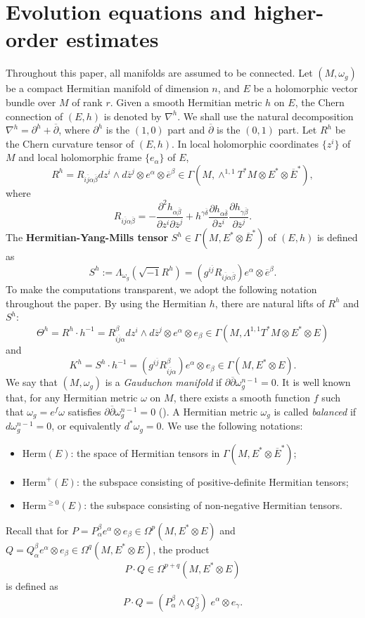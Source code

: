 \documentclass[12pt, reqno]{amsart}
\newcommand\bp{{\bar\partial}}
\theoremstyle{plain}
\theoremstyle{definition}
\newcommand{\p}{\partial}
\renewcommand{\bar}{\overline}
\newcommand{\beq}{\begin{equation}}
\newcommand{\eeq}{\end{equation}}
\renewcommand{\bp}{\bar{\partial}}
\newcommand{\ts}{\otimes}
\renewcommand{\>}{\rightarrow}
\renewcommand{\>}{\rightarrow}
\renewcommand{\p}{{\partial}}
\renewcommand{\bp}{{\bar{\partial}}}
\newcommand{\om}{\omega}
\renewcommand{\bar}{\overline}
\newcommand{\smo}{\sqrt{-1}}
\newcommand{\Herm}{\mathrm{Herm}}
\numberwithin{equation}{section} %
\begin{document}
\section{Evolution equations and higher-order estimates}
Throughout this paper, all manifolds are assumed to be connected.
Let $(M,\omega_g) $ be a compact Hermitian manifold of dimension
$n$, and $E$ be a holomorphic vector bundle over $M$ of rank $r$.
Given a smooth Hermitian metric $h$ on $E$, the Chern connection of
$(E,h)$ is denoted by $\nabla^{h}$. We shall use the natural
decomposition $ \nabla^{h}=\p^{h}+\bp$, where $\p^{h}$ is the
$(1,0)$ part and $\bp$ is the $(0,1)$ part. Let $R^{h}$ be the Chern
curvature tensor of $(E,h)$. In local holomorphic coordinates
$\{z^i\}$ of $M$ and local holomorphic frame $\{e_\alpha\}$ of $E$,
\beq R^h=R_{i\bar j\alpha\bar\beta}dz^i\wedge d\bar z^j\ts
e^\alpha\ts\bar{e}^\beta \in\Gamma\left(M,\wedge^{1,1}T^*M\ts
E^*\ts\bar{E}^*\right), \eeq where \beq R_{i\bar j\alpha\bar\beta}
=  -\frac{\p^2 h_{\alpha\bar\beta}}{\p z^i\p \bar z^j}
+h^{\gamma\bar\delta} \frac{\p h_{\alpha\bar\delta}}{\p z^i}\frac{\p
h_{\gamma\bar\beta}}{\p \bar z^j}. \label{curvature tensor local
formula} \eeq The \textbf{Hermitian-Yang-Mills tensor} $ S^{h}\in
\Gamma(M,E^*\ts \bar E^*)$ of $(E,h)$  is defined as \beq S^{h}
:=\Lambda_{\omega_g}\left(\smo R^{h}\right)=\left(g^{i\bar
j}R_{i\bar j\alpha\bar\beta}\right) e^\alpha\ts \bar e^\beta.
\eeq To make the computations transparent, we adopt the following
notation throughout the paper.  By using the Hermitian $h$, there
are natural lifts of $R^h$ and $S^h$: \beq\Theta^h=R^h\cdot
h^{-1}=R_{i\bar j\alpha}^{\beta}dz^i\wedge d\bar z^j\ts
e^\alpha\ts{e}_\beta\in \Gamma(M,\Lambda^{1,1}T^*M\ts E^*\ts E)\eeq
and \beq   K^h=S^h\cdot h^{-1}=\left(g^{i\bar j}R_{i\bar
j\alpha}^{\beta}\right) e^\alpha\ts  e_\beta\in \Gamma(M,E^*\ts E).
\eeq
We say that $(M,\omega_g)$ is a \emph{Gauduchon manifold} if
$
\p\bp\om_g^{n-1}=0.
$
It is well known that, for any Hermitian metric $\omega$ on $M$,
there exists a smooth function $f$ such that
$
\omega_g = e^{f}\omega
$
satisfies $\p\bp\om_g^{n-1}=0$ (\cite{Gau84}). A Hermitian metric $\omega_g$ is called \emph{balanced} if $d\omega_g^{n-1}=0$, or equivalently $d^*\omega_g=0$.  We use the following notations:

\begin{itemize}
    \item $\mathrm{Herm}(E)$: the space of Hermitian tensors in
    $\Gamma(M, E^*\otimes \bar{E}^*)$;

    \item $\Herm^+(E)$: the subspace consisting of
    positive-definite Hermitian tensors;

    \item $\Herm^{\ge 0}(E)$: the subspace consisting of
    non-negative Hermitian tensors.
\end{itemize}
Recall that for $ P=P_\alpha^\beta e^\alpha\ts e_\beta \in \Omega^p(M,E^*\otimes E) $ and $ Q=Q_\alpha^\beta e^\alpha\ts e_\beta \in \Omega^q(M,E^*\otimes E) $, the product \beq  P\cdot Q \in \Omega^{p+q}(M,E^*\otimes E) \eeq  is defined as
\beq P \cdot Q = (P_\alpha^\beta \wedge Q_\beta^\gamma) \; e^\alpha \otimes e_\gamma. \eeq
\end{document}
